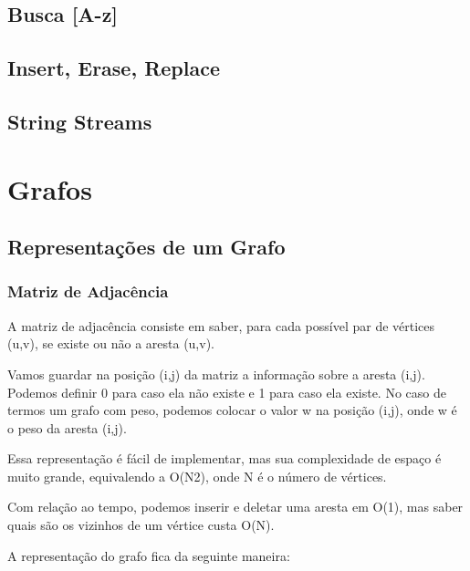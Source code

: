 \documentclass[a4paper,12pt]{article}
\begin{document}
\subsection{Busca [A-z]}

\subsection{Insert, Erase, Replace}

\subsection{String Streams}

\newpage
\section{Grafos}
\subsection{Representações de um Grafo}
\subsubsection{Matriz de Adjacência}

\indent\indent A matriz de adjacência consiste em saber, para cada possível par de vértices (u,v), se existe ou não a aresta (u,v).

\indent Vamos guardar na posição (i,j) da matriz a informação sobre a aresta (i,j). Podemos definir 0 para caso ela não existe e 1 para caso ela existe. No caso de termos um grafo com peso, podemos colocar o valor w na posição (i,j), onde w é o peso da aresta (i,j).

\indent Essa representação é fácil de implementar, mas sua complexidade de espaço é muito grande, equivalendo a O(N2), onde N é o número de vértices.

\indent Com relação ao tempo, podemos inserir e deletar uma aresta em O(1), mas saber quais são os vizinhos de um vértice custa O(N).

\indent A representação do grafo fica da seguinte maneira:
\end{document}
